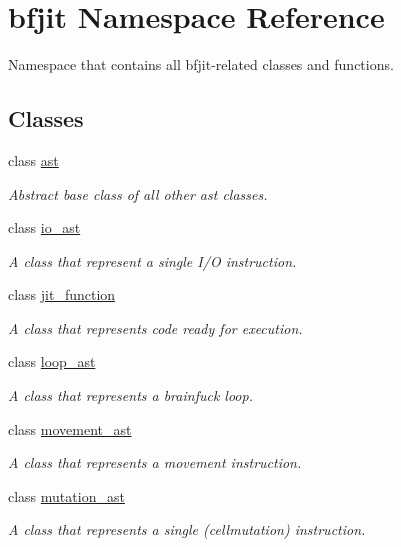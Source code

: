 \hypertarget{namespacebfjit}{}\section{bfjit Namespace Reference}
\label{namespacebfjit}


Namespace that contains all bfjit-\/related classes and functions.  


\subsection*{Classes}
\begin{DoxyCompactItemize}
\item 
class \hyperlink{classbfjit_1_1ast}{ast}
\begin{DoxyCompactList}\small\item\em Abstract base class of all other ast classes. \end{DoxyCompactList}\item 
class \hyperlink{classbfjit_1_1io__ast}{io\+\_\+ast}
\begin{DoxyCompactList}\small\item\em A class that represent a single I/O instruction. \end{DoxyCompactList}\item 
class \hyperlink{classbfjit_1_1jit__function}{jit\+\_\+function}
\begin{DoxyCompactList}\small\item\em A class that represents code ready for execution. \end{DoxyCompactList}\item 
class \hyperlink{classbfjit_1_1loop__ast}{loop\+\_\+ast}
\begin{DoxyCompactList}\small\item\em A class that represents a brainfuck loop. \end{DoxyCompactList}\item 
class \hyperlink{classbfjit_1_1movement__ast}{movement\+\_\+ast}
\begin{DoxyCompactList}\small\item\em A class that represents a movement instruction. \end{DoxyCompactList}\item 
class \hyperlink{classbfjit_1_1mutation__ast}{mutation\+\_\+ast}
\begin{DoxyCompactList}\small\item\em A class that represents a single (cellmutation) instruction. \end{DoxyCompactList}\item 

\end{DoxyCompactItemize}
